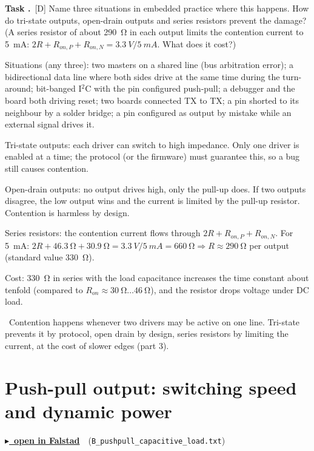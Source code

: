 \documentclass[a4paper,11pt]{article}
\newcounter{task}[section]
\renewcommand{\thetask}{\thesection.\arabic{task}}
\newcommand{\task}[1]{\par\medskip\refstepcounter{task}%
  {\sffamily\bfseries\color{rwuviolet}Task \thetask}\ {\sffamily\small\color{rwucyandark}[#1]}\quad}
\newenvironment{solution}{\begin{solbox}}{\end{solbox}}
\newcommand{\answer}{\par\smallskip{\sffamily\bfseries\color{rwuviolet}Answer:}\ }
\newcommand{\circuitlink}[2]{\href{#1}{\color{rwucyandark}\sffamily\bfseries $\blacktriangleright$\ open in Falstad}\ \ (\texttt{#2})}
\begin{document}
\task{D} Name three situations in embedded practice where this happens. How do tri-state outputs, open-drain
outputs and series resistors prevent the damage? (A series resistor of about \SI{290}{\ohm} in each output
limits the contention current to \SI{5}{mA}: $2R+R_{on,P}+R_{on,N}=\SI{3.3}{V}/\SI{5}{mA}$. What does it cost?)

\begin{solution}
\begin{steps}
  \item Situations (any three): two masters on a shared line (bus arbitration error); a bidirectional data line
        where both sides drive at the same time during the turn-around; bit-banged I$^2$C with the pin
        configured push-pull; a debugger and the board both driving reset; two boards connected TX to TX; a pin
        shorted to its neighbour by a solder bridge; a pin configured as output by mistake while an external
        signal drives it.
  \item Tri-state outputs: each driver can switch to high impedance. Only one driver is enabled at a time;
        the protocol (or the firmware) must guarantee this, so a bug still causes contention.
  \item Open-drain outputs: no output drives high, only the pull-up does. If two outputs disagree, the low
        output wins and the current is limited by the pull-up resistor. Contention is harmless by design.
  \item Series resistors: the contention current flows through $2R+R_{on,P}+R_{on,N}$. For \SI{5}{mA}:
        $2R+\SI{46.3}{\ohm}+\SI{30.9}{\ohm}=\SI{3.3}{V}/\SI{5}{mA}=\SI{660}{\ohm}\Rightarrow R\approx\SI{290}{\ohm}$
        per output (standard value \SI{330}{\ohm}).
  \item Cost: \SI{330}{\ohm} in series with the load capacitance increases the time constant about tenfold
        (compared to $R_{on}\approx\SI{30}{\ohm}\ldots\SI{46}{\ohm}$), and the resistor drops voltage under DC load.
\end{steps}
\answer Contention happens whenever two drivers may be active on one line. Tri-state prevents it by protocol,
open drain by design, series resistors by limiting the current, at the cost of slower edges (part 3).
\end{solution}

\needspace{0.45\textheight}
\section{Push-pull output: switching speed and dynamic power}
\circuitlink{\linkB}{B\_pushpull\_capacitive\_load.txt}
\end{document}
